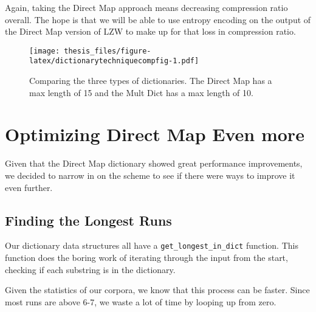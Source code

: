 \documentclass[12pt,twoside]{reedthesis}
\begin{document}
Again, taking the Direct Map approach means decreasing compression ratio overall. The hope is that we will be able to use entropy encoding on the output of the Direct Map version of LZW to make up for that loss in compression ratio.
\begin{figure}
\centering
\texttt{[image: thesis\_files/figure-latex/dictionarytechniquecompfig-1.pdf]}
\caption{\label{fig:dictionarytechniquecompfig}Comparing the three types of dictionaries. The Direct Map has a max length of 15 and the Mult Dict has a max length of 10.}
\end{figure}
\hypertarget{optimizing-direct-map-even-more}{%
\section{Optimizing Direct Map Even more}\label{optimizing-direct-map-even-more}}

Given that the Direct Map dictionary showed great performance improvements, we decided to narrow in on the scheme to see if there were ways to improve it even further.

\hypertarget{finding-the-longest-runs}{%
\subsection{Finding the Longest Runs}\label{finding-the-longest-runs}}

Our dictionary data structures all have a \texttt{get\_longest\_in\_dict} function. This function does the boring work of iterating through the input from the start, checking if each substring is in the dictionary.

Given the statistics of our corpora, we know that this process can be faster. Since most runs are above 6-7, we waste a lot of time by looping up from zero.
\end{document}
